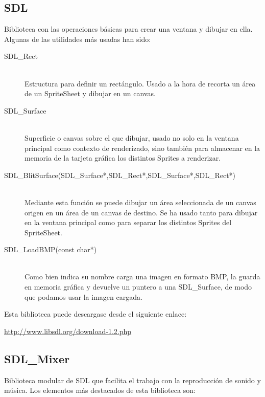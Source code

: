 \documentclass[parskip=half*]{scrartcl}
\begin{document}
	\subsection{SDL}
	Biblioteca con las operaciones b\'asicas para crear una ventana y dibujar en ella. Algunas de las utilidades m\'as usadas han sido:
	\begin{description}
		\item[SDL\_Rect] \hfill \\		Estructura para definir un rect\'angulo. Usado a la hora de recorta un \'area de un SpriteSheet y dibujar en un canvas.
		
		\item[SDL\_Surface] \hfill \\	Superficie o canvas sobre el que dibujar, usado no solo en la ventana principal como contexto de renderizado, sino tambi\'en para almacenar en la memoria de la tarjeta gr\'afica los distintos Sprites a renderizar.
		
		\item[SDL\_BlitSurface(SDL\_Surface*,SDL\_Rect*,SDL\_Surface*,SDL\_Rect*)] \hfill \\ Mediante esta funci\'on se puede dibujar un \'area seleccionada de un canvas origen en un \'area de un canvas de destino. Se ha usado tanto para dibujar en la ventana principal como para separar los distintos Sprites del SpriteSheet.

		\item[SDL\_LoadBMP(const char*)] \hfill \\	Como bien indica su nombre carga una imagen en formato BMP, la guarda en memoria gr\'afica y devuelve un puntero a una SDL\_Surface, de modo que podamos usar la imagen cargada.
	\end{description}

	Esta biblioteca puede descargase desde el siguiente enlace: \\

	\centerline{\url{http://www.libsdl.org/download-1.2.php}}
	\subsection{SDL\_Mixer}
	Biblioteca modular de SDL que facilita el trabajo con la reproducci\'on de sonido y m\'usica. Los elementos m\'as destacados de esta biblioteca son:
\end{document}
